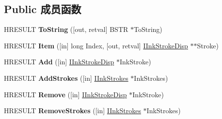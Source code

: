 \subsection*{Public 成员函数}
\begin{DoxyCompactItemize}
\item 
\mbox{\label{interface_m_s_i_n_k_a_u_t_lib_1_1_i_ink_strokes_a7ccaf3ee6938f6e7da3ad6c4f6b56d9e}} 
H\+R\+E\+S\+U\+LT {\bfseries To\+String} (\mbox{[}out, retval\mbox{]} B\+S\+TR $\ast$To\+String)
\item 
\mbox{\label{interface_m_s_i_n_k_a_u_t_lib_1_1_i_ink_strokes_a7c948888cce186e97d22c9acceba3807}} 
H\+R\+E\+S\+U\+LT {\bfseries Item} (\mbox{[}in\mbox{]} long Index, \mbox{[}out, retval\mbox{]} \hyperlink{interface_m_s_i_n_k_a_u_t_lib_1_1_i_ink_stroke_disp}{I\+Ink\+Stroke\+Disp} $\ast$$\ast$Stroke)
\item 
\mbox{\label{interface_m_s_i_n_k_a_u_t_lib_1_1_i_ink_strokes_a6c6542b2400fcba93cf90ce14cd2b3aa}} 
H\+R\+E\+S\+U\+LT {\bfseries Add} (\mbox{[}in\mbox{]} \hyperlink{interface_m_s_i_n_k_a_u_t_lib_1_1_i_ink_stroke_disp}{I\+Ink\+Stroke\+Disp} $\ast$Ink\+Stroke)
\item 
\mbox{\label{interface_m_s_i_n_k_a_u_t_lib_1_1_i_ink_strokes_ab56b8679bb108aa569d962c9f1a6d77b}} 
H\+R\+E\+S\+U\+LT {\bfseries Add\+Strokes} (\mbox{[}in\mbox{]} \hyperlink{interface_m_s_i_n_k_a_u_t_lib_1_1_i_ink_strokes}{I\+Ink\+Strokes} $\ast$Ink\+Strokes)
\item 
\mbox{\label{interface_m_s_i_n_k_a_u_t_lib_1_1_i_ink_strokes_aba25c1436f36210a5271ecc09b50e14e}} 
H\+R\+E\+S\+U\+LT {\bfseries Remove} (\mbox{[}in\mbox{]} \hyperlink{interface_m_s_i_n_k_a_u_t_lib_1_1_i_ink_stroke_disp}{I\+Ink\+Stroke\+Disp} $\ast$Ink\+Stroke)
\item 
\mbox{\label{interface_m_s_i_n_k_a_u_t_lib_1_1_i_ink_strokes_aeb9a6c156f910d68cf7a0f83247db4ab}} 
H\+R\+E\+S\+U\+LT {\bfseries Remove\+Strokes} (\mbox{[}in\mbox{]} \hyperlink{interface_m_s_i_n_k_a_u_t_lib_1_1_i_ink_strokes}{I\+Ink\+Strokes} $\ast$Ink\+Strokes)
$$
\end{DoxyCompactItemize}
